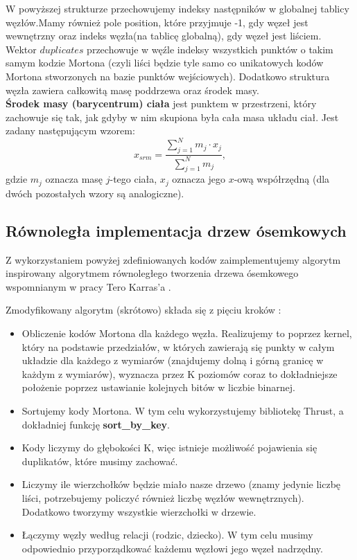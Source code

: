\documentclass[14pt,twoside,a4paper]{article}
\theoremstyle{definition}
\begin{document}
W powyższej strukturze przechowujemy indeksy następników w globalnej tablicy węzłów.Mamy również pole position, które przyjmuje -1, gdy węzeł jest wewnętrzny oraz indeks węzła(na tablicę globalną), gdy węzeł jest liściem. Wektor $duplicates$ przechowuje w węźle indeksy wszystkich punktów o takim samym kodzie Mortona (czyli liści będzie tyle samo co unikatowych kodów Mortona stworzonych na bazie punktów wejściowych). Dodatkowo struktura węzła zawiera całkowitą masę poddrzewa oraz środek masy.\\

\textbf{Środek masy (barycentrum) ciała}  jest punktem w przestrzeni, który zachowuje się tak, jak gdyby w nim skupiona była cała masa układu ciał. Jest zadany następującym wzorem:
$$ x_{srm} = \frac{\sum_{j=1}^N m_j\cdot x_j}{\sum_{j=1}^N m_j},$$ gdzie $m_j$ oznacza masę $j$-tego ciała, $x_j$ oznacza jego $x$-ową współrzędną (dla dwóch pozostałych wzory są analogiczne). \\


\subsection{\Large Równoległa implementacja drzew ósemkowych}
Z wykorzystaniem powyżej zdefiniowanych kodów zaimplementujemy algorytm inspirowany algorytmem równoległego tworzenia drzewa ósemkowego wspomnianym w pracy Tero Karras'a \cite{tero}.

Zmodyfikowany algorytm (skrótowo) składa się z pięciu kroków :
\begin{itemize}
\item Obliczenie kodów Mortona dla każdego węzła. Realizujemy to poprzez kernel, który na podstawie przedziałów, w których zawierają się punkty w całym układzie dla każdego z wymiarów (znajdujemy dolną i górną granicę w każdym z wymiarów), wyznacza przez K poziomów coraz to dokładniejsze położenie poprzez ustawianie kolejnych bitów w liczbie binarnej. 
\item Sortujemy kody Mortona. W tym celu wykorzystujemy bibliotekę Thrust, a dokładniej funkcję \textbf{sort\_by\_key}. 
\item Kody liczymy do głębokości K, więc istnieje możliwość pojawienia się duplikatów, które musimy zachować. 
\item Liczymy ile wierzchołków będzie miało nasze drzewo (znamy jedynie liczbę liści, potrzebujemy policzyć również liczbę węzłów wewnętrznych). Dodatkowo tworzymy wszystkie wierzchołki w drzewie.
\item  Łączymy węzły według relacji (rodzic, dziecko). W tym celu musimy odpowiednio przyporządkować każdemu węzłowi jego węzeł nadrzędny.
\end{itemize}
\end{document}

